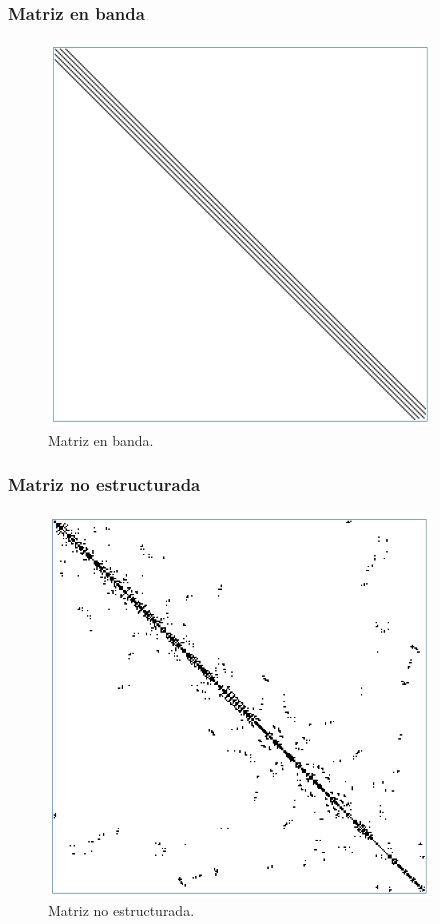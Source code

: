 \begin{frame}
\frametitle{Matriz en banda}
\begin{figure}[h!]
    \centering
    \includegraphics[scale=0.6]{Imagenes/tipo_matrices_01_banda.png}
    \caption{Matriz en banda.}
\end{figure}
\end{frame}
\begin{frame}
\frametitle{Matriz no estructurada}
\begin{figure}[h!]
    \centering
    \includegraphics[scale=0.6]{Imagenes/tipo_matrices_02_no_estructurada.png}
    \caption{Matriz no estructurada.}
\end{figure}
\end{frame}
